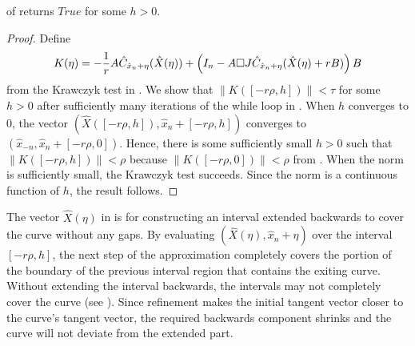 \begin{algorithm}[ht]
 \end{algorithm}


\begin{lemma}
      of  returns $True$ for some $h>0$.
\end{lemma}
\begin{proof}
Define 
$$    K(\eta)=-\frac{1}{r}A \hat{C}_{\hat{x}_n+\eta}(\hat{X}(\eta))\\+\left(I_n-A\square J\hat{C}_{\hat{x}_n+\eta}(\hat{X}(\eta)+rB)\right)B$$ from the Krawczyk test in .
    We show that 
    $\|K([-r\rho,h])\|< \tau$
    for some $h>0$ after sufficiently many iterations of the while loop in  .
    When $h$ converges to $0$, the vector $(\hat{X}([-r\rho,h]),\hat{x}_n+[-r\rho,h])$ converges to $(\hat{x}_{-n},\hat{x}_n+[-r\rho,0])$. Hence, there is some sufficiently small $h>0$ such that $\|K([-r\rho,h])\|< \rho$ because $\|K([-r\rho,0])\|<\rho$ from . When the norm is sufficiently small, the Krawczyk test succeeds.  Since the norm is a continuous function of $h$, the result follows.
\end{proof}

The vector $\hat{X}(\eta)$ in  is for constructing an interval extended backwards to cover the curve without any gaps. By evaluating $(\hat{X}(\eta),\hat{x}_n+\eta)$ over the interval $[-r\rho, h]$, the next step of the approximation completely covers the portion of the boundary of the previous interval region that contains the exiting curve.  Without extending the interval backwards, the intervals may not completely cover the curve (see ). Since refinement makes the initial tangent vector closer to the curve's tangent vector, the required backwards component shrinks and the curve will not deviate from the extended part.

